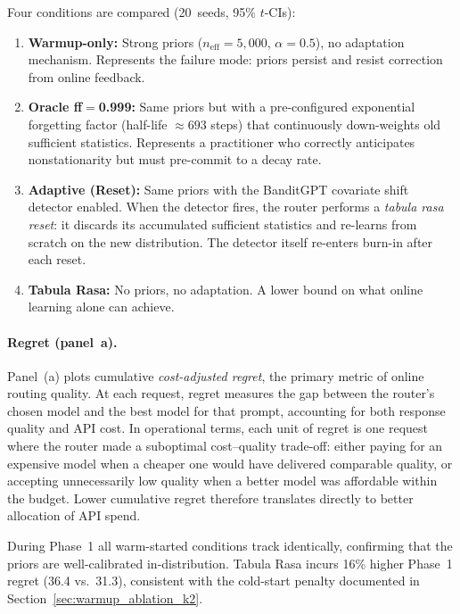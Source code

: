 Four conditions are compared (20~seeds, 95\% $t$-CIs):

\begin{enumerate}[leftmargin=*,noitemsep]
  \item \textbf{Warmup-only:}
        Strong priors ($n_{\mathrm{eff}}{=}5{,}000$, $\alpha{=}0.5$),
        no adaptation mechanism.  Represents the failure mode: priors
        persist and resist correction from online feedback.
  \item \textbf{Oracle ff$=$0.999:}
        Same priors but with a pre-configured exponential forgetting
        factor (half-life ${\approx}693$ steps) that continuously
        down-weights old sufficient statistics.  Represents a
        practitioner who correctly anticipates nonstationarity but
        must pre-commit to a decay rate.
  \item \textbf{Adaptive (Reset):}
        Same priors with the BanditGPT covariate shift detector
        enabled.  When the detector fires, the router performs a
        \emph{tabula rasa reset}: it discards its accumulated
        sufficient statistics and re-learns from scratch on the new
        distribution.  The detector itself re-enters burn-in after
        each reset.
  \item \textbf{Tabula Rasa:}
        No priors, no adaptation.  A lower bound on what online
        learning alone can achieve.
\end{enumerate}

\paragraph{Regret (panel~a).}
Panel~(a) plots cumulative \emph{cost-adjusted regret}, the primary
metric of online routing quality.  At each request, regret measures the
gap between the router's chosen model and the best model for that
prompt, accounting for both response quality and API cost.
In operational terms, each unit of regret is one request where the
router made a suboptimal cost--quality trade-off: either paying for an
expensive model when a cheaper one would have delivered comparable
quality, or accepting unnecessarily low quality when a better model
was affordable within the budget.  Lower cumulative regret therefore
translates directly to better allocation of API spend.

During Phase~1 all warm-started conditions track identically,
confirming that the priors are well-calibrated in-distribution.
Tabula Rasa incurs 16\% higher Phase~1 regret (36.4 vs.\ 31.3),
consistent with the cold-start penalty documented in
Section~\ref{sec:warmup_ablation_k2}.

